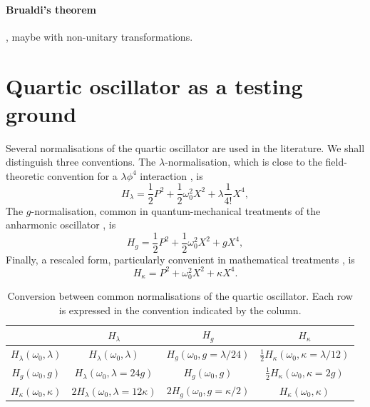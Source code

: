 \documentclass{article}
\theoremstyle{definition}
\begin{document}
\paragraph{Brualdi's theorem} 
\label{par:Brualdi}
\cite{paper:Brualdi1982,paper:Kolotilina2004Brualdi,book:BrualdiRyser1991CombinatorialMatrixTheory}, maybe with non-unitary transformations.

\section{Quartic oscillator as a testing ground}

Several normalisations of the quartic oscillator are used in the literature.
We shall distinguish three conventions. The $\lambda$-normalisation,
which is close to the field-theoretic convention
\cite{notes:TongQFT,book:PeskinSchroeder1995} for a $\lambda\phi^4$
interaction \cite{paper:Svaiter2006AnharmonicOscillator}, is
\begin{equation}
    H_\lambda
    = \frac{1}{2} P^2
    + \frac{1}{2} \omega_0^2 X^2
    + \lambda \frac{1}{4!} X^4 ,
    \label{eq:quartic-lambda}
\end{equation}
The $g$-normalisation, common in quantum-mechanical treatments
\cite{notes:Greensite2003QuantumMechanics,
      book:Merzbacher1998QuantumMechanics,
      book:LandauLifshitz1977QuantumMechanics}
of the anharmonic oscillator
\cite{paper:Caffarel2025QuarticOscillator,
      paper:Yamazaki1983AnharmonicOscillators}, is
\begin{equation}
    H_g
    = \frac{1}{2} P^2
    + \frac{1}{2} \omega_0^2 X^2
    + g X^4 ,
    \label{eq:quartic-g}
\end{equation}
Finally, a rescaled form, particularly convenient in mathematical
treatments
\cite{paper:Simon1970AnharmonicOscillator,
      book:Kato1995PerturbationTheory}, is
\begin{equation}
    H_\kappa
    = P^2
    + \omega_0^2 X^2
    + \kappa X^4 .
    \label{eq:quartic-kappa}
\end{equation}

\begin{table}[ht]
\centering
\begin{tabular}{c|ccc}
 & $H_\lambda$ & $H_g$ & $H_\kappa$ \\
\hline

$H_\lambda(\omega_0,\lambda)$
&
$H_\lambda(\omega_0,\lambda)$
&
$H_g(\omega_0,g=\lambda/24)$
&
$\frac12 H_\kappa(\omega_0,\kappa=\lambda/12)$
\\[0.8em]

$H_g(\omega_0,g)$
&
$H_\lambda(\omega_0,\lambda=24g)$
&
$H_g(\omega_0,g)$
&
$\frac12 H_\kappa(\omega_0,\kappa=2g)$
\\[0.8em]

$H_\kappa(\omega_0,\kappa)$
&
$2H_\lambda(\omega_0,\lambda=12\kappa)$
&
$2H_g(\omega_0,g=\kappa/2)$
&
$H_\kappa(\omega_0,\kappa)$

\end{tabular}
\caption{Conversion between common normalisations of the quartic oscillator.
Each row is expressed in the convention indicated by the column.}
\label{tab:quartic-normalizations}
\end{table}
\end{document}

